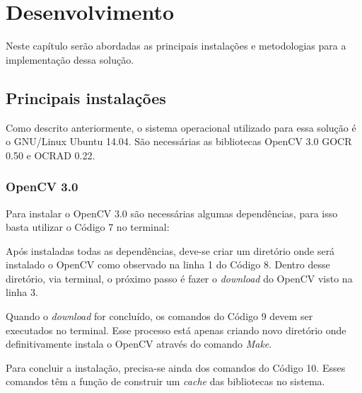 \chapter{Desenvolvimento}

Neste capítulo serão abordadas as principais instalações e metodologias para a implementação dessa solução.

\section{Principais instalações}

Como descrito anteriormente, o sistema operacional utilizado para essa solução é o GNU/Linux Ubuntu 14.04. São necessárias as bibliotecas OpenCV 3.0 GOCR 0.50 e OCRAD 0.22. 

\subsection{OpenCV 3.0}

Para instalar o OpenCV 3.0 são necessárias algumas dependências, para isso basta utilizar o Código 7 no terminal:



Após instaladas todas as dependências, deve-se criar um diretório onde será instalado o OpenCV como observado na linha 1 do Código 8. Dentro desse diretório, via terminal, o próximo passo é fazer o \textit{download} \cite{opencv} do OpenCV visto na linha 3.



Quando o \textit{download} for concluído, os comandos do Código 9 devem ser executados no terminal. Esse processo está apenas criando novo diretório onde definitivamente instala o OpenCV através do comando \textit{Make}.



Para concluir a instalação, precisa-se ainda dos comandos do Código 10. Esses comandos têm a função de construir um \textit{cache} das bibliotecas no sistema. 



